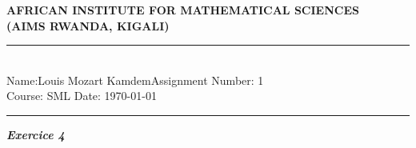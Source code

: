 \documentclass[12pt,a4paper]{article}
\newcommand{\student}{Louis Mozart Kamdem}
\begin{document}
	
	\thispagestyle{empty}
	\begin{center}
		\textbf{AFRICAN INSTITUTE FOR MATHEMATICAL SCIENCES \\[0.5cm]
			(AIMS RWANDA, KIGALI)}
		\vspace{1.0cm}
	\end{center}
	
	\noindent
	\rule{17cm}{0.2cm}\\[0.3cm]
	Name:\student \hfill Assignment Number: 1\\[0.1cm]
	Course: SML \hfill Date: \today\\
	\rule{17cm}{0.05cm}
	\vspace{1.0cm} 
	
	
	
\textbf{\textit{Exercice 4}}	
	
\end{document}
